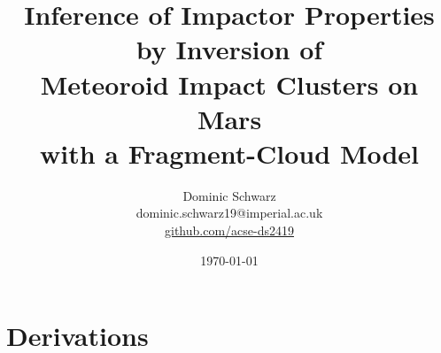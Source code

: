 \documentclass[%
   draft,     %
   fontsize=10pt,
   headings=small,
   british,          %
   paper=a4,         %
   BCOR=5mm,          %
   DIV=11,            %
   headlines=1.1,     %
   headinclude=false,%
   footinclude=false,%
   mpinclude=false,  %
   pagesize,         %
   oneside,
   twocolumn,
   notitlepage,     %
   parskip=false,    %
   headsepline=false, %
   toc=graduated,    %
   bibliography=totoc,%
   toc=listofnumbered, %
   listof=graduated, %
   numbers=noenddot, %
]{scrartcl}%
\title{Inference of Impactor Properties by Inversion of \\
       Meteoroid Impact Clusters on Mars \\
       with a Fragment-Cloud Model}
\author{\small Dominic Schwarz \\
        \small dominic.schwarz19@imperial.ac.uk \\
        \small \url{github.com/acse-ds2419}}
\date{\today}
\begin{document}
\renewcommand\bf{\bfseries}  %
\setlength{\parindent}{1.5em} %

\newcommand{\unit}[1]{\,\mathrm{#1}}
\newcommand{\e}[1]{\cdot 10^{#1}}
\newcommand{\intd}[1]{\,\mathrm{d}#1}
\newcommand{\parnorm}[1]{\frac{\partial}{\partial #1}}
\newcommand{\parnormp}[2]{\frac{\partial^#2}{\partial #1^#2}}
\newcommand{\parfrac}[2]{\frac{\partial #1}{\partial #2}}
\newcommand{\parfracp}[3]{\frac{\partial^#3 #1}{\partial #2^#3}}



\maketitle



	

%






\section{Derivations}



\FloatBarrier



%


   
\end{document}
